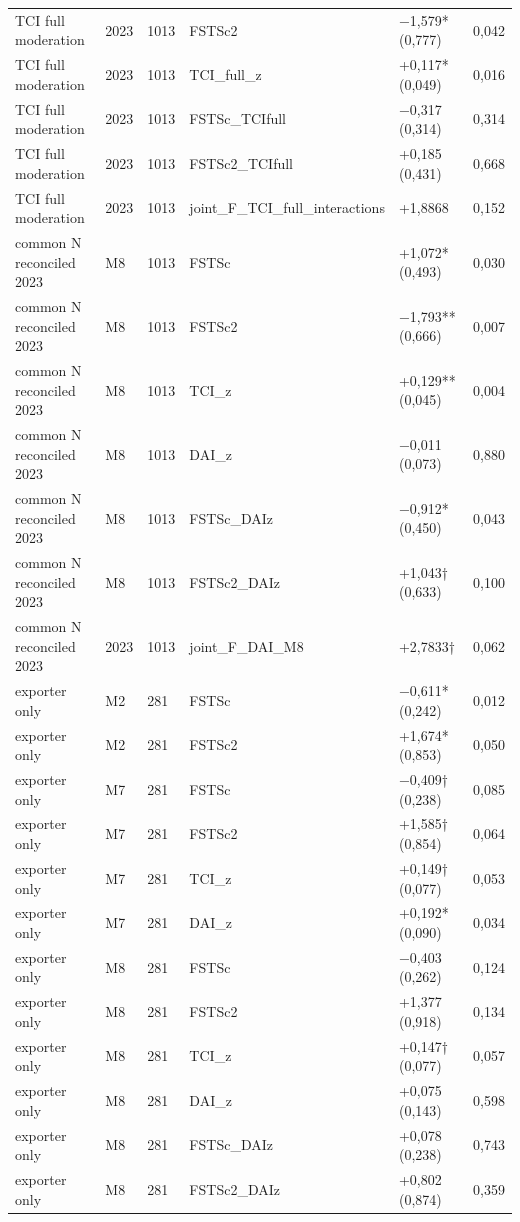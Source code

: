\documentclass[12pt,a4paper]{article}
\begin{document}
\begin{longtable}[]{@{}llllll@{}}
TCI full moderation & 2023 & 1013 & FSTSc2 & −1,579* (0,777) & 0,042 \\
TCI full moderation & 2023 & 1013 & TCI\_full\_z & +0,117* (0,049) &
0,016 \\
TCI full moderation & 2023 & 1013 & FSTSc\_TCIfull & −0,317 (0,314) &
0,314 \\
TCI full moderation & 2023 & 1013 & FSTSc2\_TCIfull & +0,185 (0,431) &
0,668 \\
TCI full moderation & 2023 & 1013 & joint\_F\_TCI\_full\_interactions &
+1,8868 & 0,152 \\
common N reconciled 2023 & M8 & 1013 & FSTSc & +1,072* (0,493) &
0,030 \\
common N reconciled 2023 & M8 & 1013 & FSTSc2 & −1,793** (0,666) &
0,007 \\
common N reconciled 2023 & M8 & 1013 & TCI\_z & +0,129** (0,045) &
0,004 \\
common N reconciled 2023 & M8 & 1013 & DAI\_z & −0,011 (0,073) &
0,880 \\
common N reconciled 2023 & M8 & 1013 & FSTSc\_DAIz & −0,912* (0,450) &
0,043 \\
common N reconciled 2023 & M8 & 1013 & FSTSc2\_DAIz & +1,043† (0,633) &
0,100 \\
common N reconciled 2023 & 2023 & 1013 & joint\_F\_DAI\_M8 & +2,7833† &
0,062 \\
exporter only & M2 & 281 & FSTSc & −0,611* (0,242) & 0,012 \\
exporter only & M2 & 281 & FSTSc2 & +1,674* (0,853) & 0,050 \\
exporter only & M7 & 281 & FSTSc & −0,409† (0,238) & 0,085 \\
exporter only & M7 & 281 & FSTSc2 & +1,585† (0,854) & 0,064 \\
exporter only & M7 & 281 & TCI\_z & +0,149† (0,077) & 0,053 \\
exporter only & M7 & 281 & DAI\_z & +0,192* (0,090) & 0,034 \\
exporter only & M8 & 281 & FSTSc & −0,403 (0,262) & 0,124 \\
exporter only & M8 & 281 & FSTSc2 & +1,377 (0,918) & 0,134 \\
exporter only & M8 & 281 & TCI\_z & +0,147† (0,077) & 0,057 \\
exporter only & M8 & 281 & DAI\_z & +0,075 (0,143) & 0,598 \\
exporter only & M8 & 281 & FSTSc\_DAIz & +0,078 (0,238) & 0,743 \\
exporter only & M8 & 281 & FSTSc2\_DAIz & +0,802 (0,874) & 0,359 \\

\end{longtable}
\end{document}
